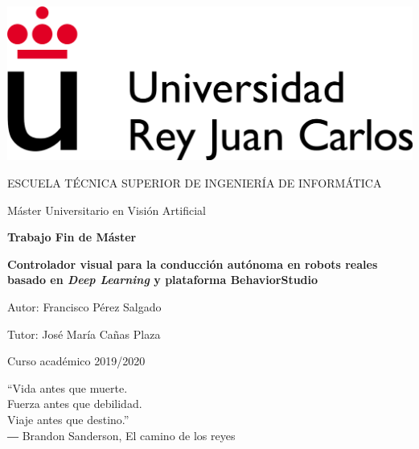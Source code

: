 
\begin{titlepage}
	\begin{center}
	

		\begin{center}
			\includegraphics[width=0.6\linewidth]{img/etsii}
		\end{center}
		\vspace{13mm}
		
		\fontsize{15.5}{14}\selectfont ESCUELA TÉCNICA SUPERIOR DE INGENIERÍA DE INFORMÁTICA
		\vspace{13mm}
		
		\fontsize{14}{14}\selectfont Máster Universitario en Visión Artificial
		
		\vspace{55pt}
		
		\fontsize{15.7}{14}\selectfont \textbf{Trabajo Fin de Máster} 
		
		\vspace{10mm}
		  \begin{huge}
			\textbf{Controlador visual para la conducción autónoma en robots reales basado en \textit{Deep Learning} y plataforma BehaviorStudio}
		\end{huge}
		\vspace{20mm}
		
		
		\begin{large}
			Autor: Francisco Pérez Salgado
			
			Tutor: José María Cañas Plaza
			
			\vspace{10mm}
		\end{large}
		\begin{normalsize}
			Curso académico 2019/2020	
		\end{normalsize}
		\vspace{10mm}
		
	\end{center}
	
\end{titlepage}

\newpage
\thispagestyle{empty}
\begin{dedication}
“Vida antes que muerte. \\
Fuerza antes que debilidad. \\
Viaje antes que destino.” \\
\vspace{5mm} %
― Brandon Sanderson, El camino de los reyes
\end{dedication}

